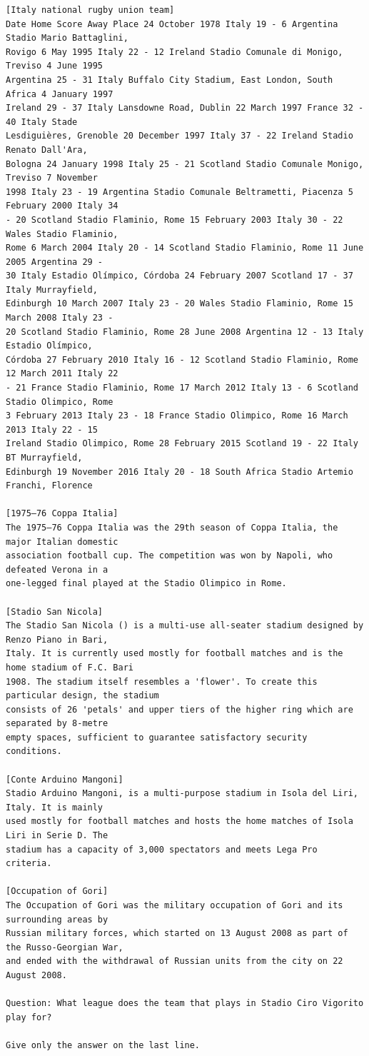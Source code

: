 \documentclass[10pt]{article}
\begin{document}
\begin{verbatim}
[Italy national rugby union team]
Date Home Score Away Place 24 October 1978 Italy 19 - 6 Argentina Stadio Mario Battaglini,
Rovigo 6 May 1995 Italy 22 - 12 Ireland Stadio Comunale di Monigo, Treviso 4 June 1995
Argentina 25 - 31 Italy Buffalo City Stadium, East London, South Africa 4 January 1997
Ireland 29 - 37 Italy Lansdowne Road, Dublin 22 March 1997 France 32 - 40 Italy Stade
Lesdiguières, Grenoble 20 December 1997 Italy 37 - 22 Ireland Stadio Renato Dall'Ara,
Bologna 24 January 1998 Italy 25 - 21 Scotland Stadio Comunale Monigo, Treviso 7 November
1998 Italy 23 - 19 Argentina Stadio Comunale Beltrametti, Piacenza 5 February 2000 Italy 34
- 20 Scotland Stadio Flaminio, Rome 15 February 2003 Italy 30 - 22 Wales Stadio Flaminio,
Rome 6 March 2004 Italy 20 - 14 Scotland Stadio Flaminio, Rome 11 June 2005 Argentina 29 -
30 Italy Estadio Olímpico, Córdoba 24 February 2007 Scotland 17 - 37 Italy Murrayfield,
Edinburgh 10 March 2007 Italy 23 - 20 Wales Stadio Flaminio, Rome 15 March 2008 Italy 23 -
20 Scotland Stadio Flaminio, Rome 28 June 2008 Argentina 12 - 13 Italy Estadio Olímpico,
Córdoba 27 February 2010 Italy 16 - 12 Scotland Stadio Flaminio, Rome 12 March 2011 Italy 22
- 21 France Stadio Flaminio, Rome 17 March 2012 Italy 13 - 6 Scotland Stadio Olimpico, Rome
3 February 2013 Italy 23 - 18 France Stadio Olimpico, Rome 16 March 2013 Italy 22 - 15
Ireland Stadio Olimpico, Rome 28 February 2015 Scotland 19 - 22 Italy BT Murrayfield,
Edinburgh 19 November 2016 Italy 20 - 18 South Africa Stadio Artemio Franchi, Florence

[1975–76 Coppa Italia]
The 1975–76 Coppa Italia was the 29th season of Coppa Italia, the major Italian domestic
association football cup. The competition was won by Napoli, who defeated Verona in a
one-legged final played at the Stadio Olimpico in Rome.

[Stadio San Nicola]
The Stadio San Nicola () is a multi-use all-seater stadium designed by Renzo Piano in Bari,
Italy. It is currently used mostly for football matches and is the home stadium of F.C. Bari
1908. The stadium itself resembles a 'flower'. To create this particular design, the stadium
consists of 26 'petals' and upper tiers of the higher ring which are separated by 8-metre
empty spaces, sufficient to guarantee satisfactory security conditions.

[Conte Arduino Mangoni]
Stadio Arduino Mangoni, is a multi-purpose stadium in Isola del Liri, Italy. It is mainly
used mostly for football matches and hosts the home matches of Isola Liri in Serie D. The
stadium has a capacity of 3,000 spectators and meets Lega Pro criteria.

[Occupation of Gori]
The Occupation of Gori was the military occupation of Gori and its surrounding areas by
Russian military forces, which started on 13 August 2008 as part of the Russo-Georgian War,
and ended with the withdrawal of Russian units from the city on 22 August 2008.

Question: What league does the team that plays in Stadio Ciro Vigorito play for?

Give only the answer on the last line.
\end{verbatim}
\end{document}
